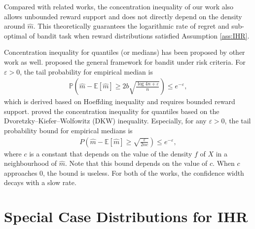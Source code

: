  Compared with related works, the concentration inequality of our work also allows unbounded reward support and does not directly depend on the density around $\hat{m}$. 
This theoretically guarantees the logarithmic rate of regret and sub-optimal of bandit task when reward distributions satisfied Assumption \ref{ass:IHR}.


Concentration inequality for quantiles (or medians) has been proposed by other work as well. \textcite{cassel_general_2018} proposed the general framework for bandit under risk criteria.
For $\varepsilon > 0$, the tail probability for empirical median is
\begin{align}
    \mathbb{P}\left(\hat{m} - \mathbb{E}[\hat{m}] \geq 2b \sqrt{\frac{\log 4n + \varepsilon}{n}}\right) \leq  e^{- \varepsilon},
\end{align}
which is derived based on Hoeffding inequality and requires bounded reward support.
\textcite{kolla_concentration_2019} proved the concentration inequality for quantiles based on the Dvoretzky–Kiefer–Wolfowitz (DKW) inequality. Especially, for any $\varepsilon >0$,  the tail probability bound for empirical medians is 
\begin{align}
\label{equ: Concentration inequality for quantiles based on DKW}
    P \left(\hat{m} - \mathbb{E}[\hat{m}] \geq \sqrt{\frac{\varepsilon}{2nc}}\right) \leq  e^{- \varepsilon},
\end{align}
where $c$ is a constant that depends on the value of the density $f$ of $X$ in a neighbourhood of $\hat{m}$.
Note that this bound depends on the value of $c$. When $c$ approaches 0, the bound is useless. For both of the works, the confidence width decays with a slow rate.  




\section{Special Case Distributions for IHR}
\label{app-sec: special case}


